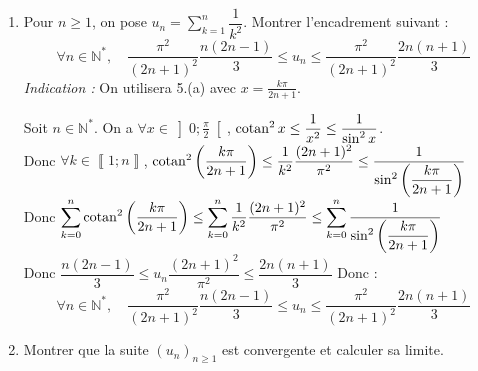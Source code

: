 \documentclass[a4paper,french,bookmarks]{article}
\def\cotan{\qopname\relax o{cotan}}
\begin{document}
\begin{enumerate}
\begin{enumerate}
\begin{tcolorbox}[colback=black!8,colframe=black!9,boxrule=.25pt,enhanced,arc is angular,arc=0pt]
On étudie la limite de $x^2\cotan x^2 - 1$ quand $x$ tend vers $0$.\\
$\lim\limits_{x \to 0} (x^2\cotan x^2 - 1)= -1 + \lim\limits_{x \to 0}\left( \dfrac{x\cos x}{\sin x}\right)^2 = -1 + \lim\limits_{x \to 0} \left(\dfrac{\cos^2 x}{\left(\dfrac{\sin x}{x}\right)^2}\right) = -1 + \dfrac{1}{1^2} = 0$.\\
Donc $\forall x \in \left]0;\dfrac{\pi}{2}\right[$, $x^2\cotan^2x\leq0$ donc $x^2\cotan^2x\leq1$ donc $\cotan^2x-1\leq\dfrac{1}{x^2}$.\\Donc :

\[\forall x \in \left]0;\frac{\pi}{2}\right[, \quad \cotan^2 x \leq \dfrac{1}{x^2} \leq \dfrac{1}{\sin^2x}\]

\end{tcolorbox}
    
            \item Pour $n \geq 1$, on pose $\displaystyle u_n = \sum_{k=1}^n \dfrac{1}{k^2}$. \quad Montrer l'encadrement suivant :
            \[ \forall n \in \mathbb{N}^*, \quad \dfrac{\pi^2}{(2n+1)^2}\frac{n(2n-1)}{3} \leq u_n \leq \frac{\pi^2}{(2n+1)^2}\frac{2n(n+1)}{3}\]
            \textit{Indication :} \quad On utilisera 5.(a) avec $x = \frac{k\pi}{2n+1}$.
            \begin{tcolorbox}[colback=black!8,colframe=black!9,boxrule=.25pt,enhanced,arc is angular,arc=0pt]
            Soit $n \in \mathbb{N}^*$. 
            On a $\forall x \in \left]0;\frac{\pi}{2}\right[$, \quad $\cotan^2 x \leq \dfrac{1}{x^2} \leq \dfrac{1}{\sin^2x}$.\\
            Donc $\forall k \in \left\llbracket1;n\right\rrbracket$, \quad $\cotan^2 \left(\dfrac{k\pi}{2n+1}\right) \leq \dfrac{1}{k^2}\dfrac{(2n+1)^2}{\pi^2} \leq \dfrac{1}{\sin^2\left(\dfrac{k\pi}{2n+1}\right)}$\\
            Donc $\displaystyle \sum_{k=0}^n \cotan^2 \left(\dfrac{k\pi}{2n+1}\right) \leq \sum_{k=0}^n \dfrac{1}{k^2}\dfrac{(2n+1)^2}{\pi^2} \leq \sum_{k=0}^n  \dfrac{1}{\sin^2\left(\dfrac{k\pi}{2n+1}\right)}$\\
            Donc $\dfrac{n(2n-1)}{3} \leq u_n \dfrac{(2n+1)^2}{\pi^2} \leq \dfrac{2n(n+1)}{3}$ Donc :\[ \forall n \in \mathbb{N}^*, \quad \dfrac{\pi^2}{(2n+1)^2}\frac{n(2n-1)}{3} \leq u_n \leq \frac{\pi^2}{(2n+1)^2}\frac{2n(n+1)}{3}\]
            \end{tcolorbox}
            \item Montrer que la suite $(u_n)_{n\geq1}$ est convergente et calculer sa limite.
            \begin{tcolorbox}[colback=black!8,colframe=black!9,boxrule=.25pt,enhanced,arc is angular,arc=0pt]

\end{tcolorbox}
\end{enumerate}
\end{enumerate}
\end{document}
